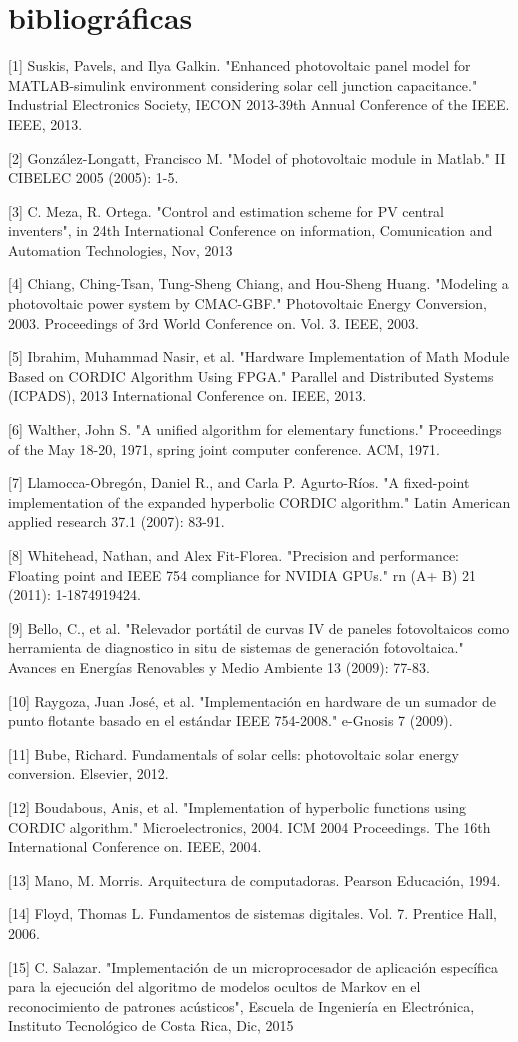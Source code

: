 \chapter{bibliográficas}

[1] Suskis, Pavels, and Ilya Galkin. "Enhanced photovoltaic panel model for MATLAB-simulink environment considering solar cell junction capacitance." Industrial Electronics Society, IECON 2013-39th Annual Conference of the IEEE. IEEE, 2013.

[2] González-Longatt, Francisco M. "Model of photovoltaic module in Matlab." II CIBELEC 2005 (2005): 1-5.

[3] C. Meza, R. Ortega. "Control and estimation scheme for PV central inventers", in 24th International Conference on information, Comunication and Automation Technologies, Nov, 2013 

[4] Chiang, Ching-Tsan, Tung-Sheng Chiang, and Hou-Sheng Huang. "Modeling a photovoltaic power system by CMAC-GBF." Photovoltaic Energy Conversion, 2003. Proceedings of 3rd World Conference on. Vol. 3. IEEE, 2003.

[5] Ibrahim, Muhammad Nasir, et al. "Hardware Implementation of Math Module Based on CORDIC Algorithm Using FPGA." Parallel and Distributed Systems (ICPADS), 2013 International Conference on. IEEE, 2013.

[6] Walther, John S. "A unified algorithm for elementary functions." Proceedings of the May 18-20, 1971, spring joint computer conference. ACM, 1971.

[7] Llamocca-Obregón, Daniel R., and Carla P. Agurto-Ríos. "A fixed-point implementation of the expanded hyperbolic CORDIC algorithm." Latin American applied research 37.1 (2007): 83-91.

[8] Whitehead, Nathan, and Alex Fit-Florea. "Precision and performance: Floating point and IEEE 754 compliance for NVIDIA GPUs." rn (A+ B) 21 (2011): 1-1874919424.

[9] Bello, C., et al. "Relevador portátil de curvas IV de paneles fotovoltaicos como herramienta de diagnostico in situ de sistemas de generación fotovoltaica." Avances en Energías Renovables y Medio Ambiente 13 (2009): 77-83.

[10] Raygoza, Juan José, et al. "Implementación en hardware de un sumador de punto flotante basado en el estándar IEEE 754-2008." e-Gnosis 7 (2009).

[11] Bube, Richard. Fundamentals of solar cells: photovoltaic solar energy conversion. Elsevier, 2012.

[12] Boudabous, Anis, et al. "Implementation of hyperbolic functions using CORDIC algorithm." Microelectronics, 2004. ICM 2004 Proceedings. The 16th International Conference on. IEEE, 2004.

[13] Mano, M. Morris. Arquitectura de computadoras. Pearson Educación, 1994.

[14] Floyd, Thomas L. Fundamentos de sistemas digitales. Vol. 7. Prentice Hall, 2006.

[15] C. Salazar. "Implementación de un microprocesador de aplicación específica
para la ejecución del algoritmo de modelos ocultos de {Markov} en el reconocimiento de patrones acústicos", Escuela de Ingeniería en Electrónica, Instituto Tecnológico de Costa Rica, Dic, 2015 

